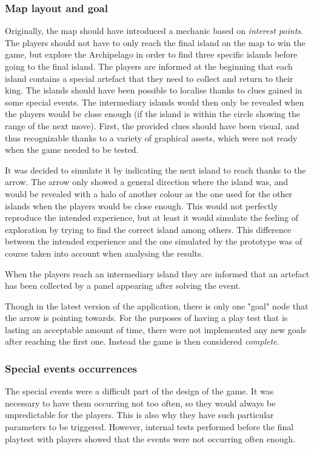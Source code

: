 \subsubsection{Map layout and goal}
Originally, the map should have introduced a mechanic based on \textit{interest points}. The players should not have to only reach the final island on the map to win the game, but explore the Archipelago in order to find three specific islands before going to the final island. The players are informed at the beginning that each island contains a special artefact that they need to collect and return to their king. The islands should have been possible to localise thanks to clues gained in some special events. The intermediary islands would then only be revealed when the players would be close enough (if the island is within the circle showing the range of the next move). First, the provided clues should have been visual, and thus recognizable thanks to a variety of graphical assets, which were not ready when the game needed to be tested.

It was decided to simulate it by indicating the next island to reach thanks to the arrow. The arrow only showed a general direction where the island was, and would be revealed with a halo of another colour as the one used for the other islands when the players would be close enough. This would not perfectly reproduce the intended experience, but at least it would simulate the feeling of exploration by trying to find the correct island among others. This difference between the intended experience and the one simulated by the prototype was of course taken into account when analysing the results.

When the players reach an intermediary island they are informed that an artefact has been collected by a panel appearing after solving the event.

Though in the latest version of the application, there is only one "goal" node that the arrow is pointing towards. For the purposes of having a play test that is lasting an acceptable amount of time, there were not implemented any new goals after reaching the first one. Instead the game is then considered \textit{complete}.
\subsubsection{Special events occurrences}
The special events were a difficult part of the design of the game. It was necessary to have them occurring not too often, so they would always be unpredictable for the players. This is also why they have such particular parameters to be triggered. However, internal tests performed before the final playtest with players showed that the events were not occurring often enough. 

